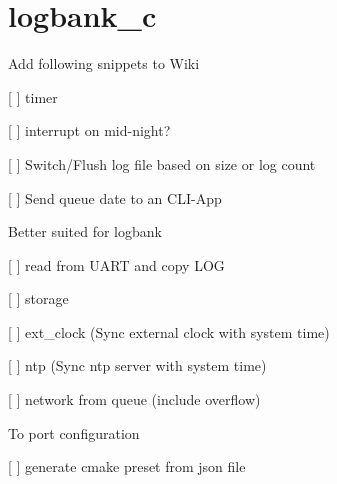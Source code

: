 \chapter{logbank\+\_\+c}
\hypertarget{index}{}\label{index}
\label{index_md_snippets_2README}%
%
 Add following snippets to Wiki
\begin{DoxyItemize}
\item \mbox{[} \mbox{]} timer
\item \mbox{[} \mbox{]} interrupt on mid-\/night?
\item \mbox{[} \mbox{]} Switch/\+Flush log file based on size or log count
\item \mbox{[} \mbox{]} Send queue date to an CLI-\/\+App
\end{DoxyItemize}

Better suited for logbank
\begin{DoxyItemize}
\item \mbox{[} \mbox{]} read from UART and copy LOG
\item \mbox{[} \mbox{]} storage
\item \mbox{[} \mbox{]} ext\+\_\+clock (Sync external clock with system time)
\item \mbox{[} \mbox{]} ntp (Sync ntp server with system time)
\item \mbox{[} \mbox{]} network from queue (include overflow)
\end{DoxyItemize}

To port configuration
\begin{DoxyItemize}
\item \mbox{[} \mbox{]} generate cmake preset from json file 
\end{DoxyItemize}